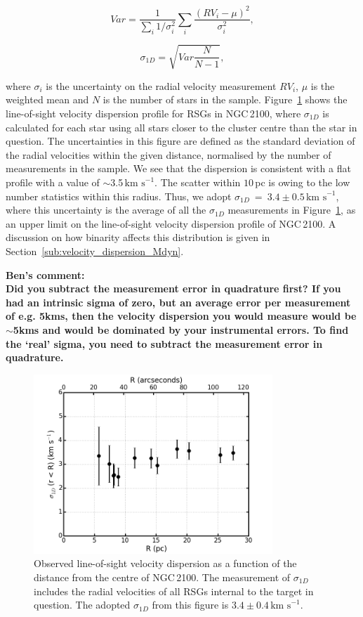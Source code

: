 \documentclass[useAMS,usenatbib]{mn2e}
\def\kms{$\mbox{km s}^{-1}$}
\begin{document}
\begin{equation}
Var = \frac{1}{\sum_{i}1/\sigma_{i}^{2}} \sum_{i}\frac{(RV_{i} - \mu)^{2}}{\sigma_{i}^{2}},
\end{equation}

\begin{equation}
  \sigma_{1D} = \sqrt{Var \frac{N}{N - 1}},
\end{equation}

\noindent where $\sigma_{i}$ is the uncertainty on the radial velocity measurement $RV_{i}$, $\mu$ is the weighted mean and $N$ is the number of stars in the sample.
Figure~\ref{fig:sig1d} shows the line-of-sight velocity dispersion profile for RSGs in NGC\,2100,
where $\sigma_{1D}$ is calculated for each star using all stars closer to the cluster centre than the star in question.
The uncertainties in this figure are defined as the standard deviation of the radial velocities within the given distance, normalised by the number of measurements in the sample.
We see that the dispersion is consistent with a flat profile with a value of $\sim$3.5\,\kms.
The scatter within $10\,$pc is owing to the low number statistics within this radius.
Thus, we adopt $\sigma_{1D}~=~3.4\pm0.5\,$\kms, where this uncertainty is the average of all the $\sigma_{1D}$ measurements in Figure~\ref{fig:sig1d}, as an upper limit on the line-of-sight velocity dispersion profile of NGC\,2100.
A discussion on how binarity affects this distribution is given in Section~\ref{sub:velocity_dispersion_Mdyn}.


\textbf{Ben's comment:\\Did you subtract the measurement error in quadrature first? If you had an intrinsic sigma of zero, but an average error per measurement of e.g. 5kms, then the velocity dispersion you would measure would be $\sim$5kms and would be dominated by your instrumental errors. To find the `real' sigma, you need to subtract the measurement error in quadrature. }

\begin{figure}
 \includegraphics[width=9.0cm]{NGC2100-sig1d-v8}
 \caption{Observed line-of-sight velocity dispersion as a function of the distance from the centre of NGC\,2100.
 The measurement of $\sigma_{1D}$ includes the radial velocities of all RSGs internal to the target in question.
 The adopted $\sigma_{1D}$ from this figure is $3.4\pm0.4\,$\kms.
\label{fig:sig1d}
          }
\end{figure}
\end{document}
